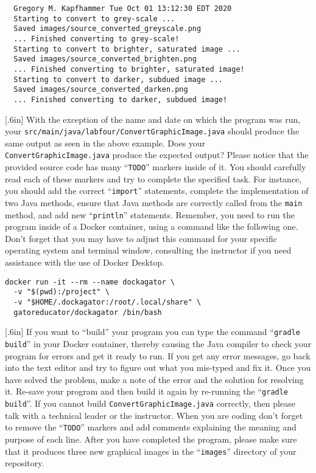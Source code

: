 \documentclass[11pt]{article}
\newcommand{\mainprogram}{\lstinline{ConvertGraphicImage.java}}
\newcommand{\mainprogramsource}{\lstinline{src/main/java/labfour/ConvertGraphicImage.java}}
\newcommand{\gradlebuild}{\command{gradle build}}
\newcommand{\command}[1]{``\lstinline{#1}''}
\newcommand{\program}[1]{\lstinline{#1}}
\newcommand{\step}[1]{``{#1}''}
\newcommand{\caution}[1]{\null\hfill\LARGE{\faWarning{}}\newline\scriptsize{\em{#1}}}
\begin{document}
\begin{verbatim}
  Gregory M. Kapfhammer Tue Oct 01 13:12:30 EDT 2020
  Starting to convert to grey-scale ...
  Saved images/source_converted_greyscale.png
  ... Finished converting to grey-scale!
  Starting to convert to brighter, saturated image ...
  Saved images/source_converted_brighten.png
  ... Finished converting to brighter, saturated image!
  Starting to convert to darker, subdued image ...
  Saved images/source_converted_darken.png
  ... Finished converting to darker, subdued image!
\end{verbatim}

\marginnote{\caution{Add missing source code}}[.6in] With the exception of the
name and date on which the program was run, your \mainprogramsource{} should
produce the same output as seen in the above example. Does your \mainprogram{}
produce the expected output?
%
Please notice that the provided source code has many \command{TODO} markers
inside of it. You should carefully read each of these markers and try to
complete the specified task. For instance, you should add the correct
\command{import} statements, complete the implementation of two Java methods,
ensure that Java methods are correctly called from the \program{main} method,
and add new \command{println} statements.
%
Remember, you need to run the program inside of a Docker container, using a
command like the following one. Don't forget that you may have to adjust this
command for your specific operating system and terminal window, consulting the
instructor if you need assistance with the use of Docker Desktop.

\begin{verbatim}
docker run -it --rm --name dockagator \
  -v "$(pwd):/project" \
  -v "$HOME/.dockagator:/root/.local/share" \
  gatoreducator/dockagator /bin/bash
\end{verbatim}

\marginnote{\caution{Produce graphical images}}[.6in] If you want to \step{build}
your program you can type the command \gradlebuild{} in your Docker container,
thereby causing the Java compiler to check your program for errors and get it
ready to run. If you get any error messages, go back into the text editor and
try to figure out what you mis-typed and fix it. Once you have solved the
problem, make a note of the error and the solution for resolving it. Re-save
your program and then build it again by re-running the \gradlebuild{}. If you
cannot build \mainprogram{} correctly, then please talk with a technical leader
or the instructor. When you are coding don't forget to remove the \command{TODO}
markers and add comments explaining the meaning and purpose of each line. After
you have completed the program, please make sure that it produces three new
graphical images in the \command{images} directory of your repository.
\end{document}
